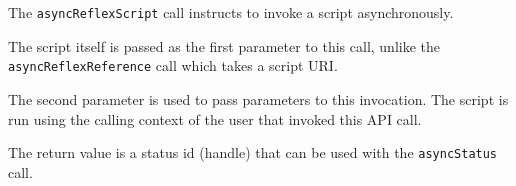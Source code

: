 The \verb+asyncReflexScript+ call instructs \Rapture to invoke a \Reflex script asynchronously.

The script itself is passed as the first parameter to this call, unlike the \verb+asyncReflexReference+ call which
takes a script URI.

The second parameter is used to pass parameters to this invocation. The script is run using the calling context
of the user that invoked this API call.

The return value is a status id (handle) that can be used with the \verb+asyncStatus+ call.
